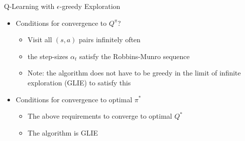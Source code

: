 \documentclass[aspectratio=169]{../latex_main/tntbeamer}  %
\begin{document}
\begin{frame}[c]{Q-Learning with $\epsilon$-greedy Exploration}
	
	\begin{itemize}
		\item Conditions for convergence to $Q^\pi$?
		\begin{itemize}
			\item Visit all $(s, a)$ pairs infinitely often
			\item the step-sizes $\alpha_t$ satisfy the Robbins-Munro sequence
			\item Note: the algorithm does not have to be greedy in the limit of infinite exploration (GLIE) to satisfy this
		\end{itemize}
		\bigskip
		\item Conditions for convergence to optimal $\pi^*$
		\begin{itemize}
			\item The above requirements to converge to optimal $Q^*$
			\item The algorithm is GLIE
		\end{itemize}
	\end{itemize}
	
\end{frame}
\end{document}

